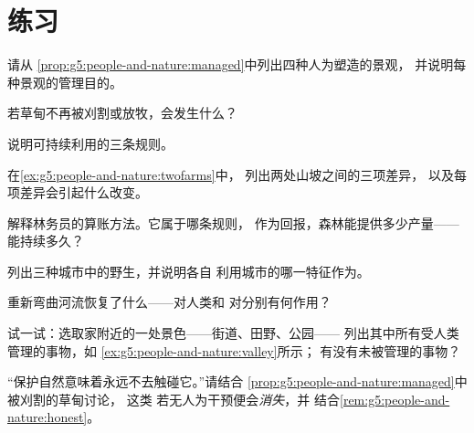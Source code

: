 \section{练习}

\begin{exercise}[$\star$]\label{exo:g5:people-and-nature:1}
请从
\cref{prop:g5:people-and-nature:managed}中列出四种人为塑造的景观，
并说明每种景观的管理目的。
\end{exercise}

\begin{exercise}[$\star$]\label{exo:g5:people-and-nature:2}
若草甸不再被刈割或放牧，会发生什么？
\end{exercise}

\begin{exercise}[$\star$]\label{exo:g5:people-and-nature:3}
说明可持续利用的三条规则。
\end{exercise}

\begin{exercise}[$\star$]\label{exo:g5:people-and-nature:4}
在\cref{ex:g5:people-and-nature:twofarms}中，
列出两处山坡之间的三项差异，
以及每项差异会引起什么改变。
\end{exercise}

\begin{exercise}[$\star$]\label{exo:g5:people-and-nature:5}
解释林务员的算账方法。它属于哪条规则，
作为回报，森林能提供多少产量——能持续多久？
\end{exercise}

\begin{exercise}[$\star$]\label{exo:g5:people-and-nature:6}
列出三种城市中的野生，并说明各自
利用城市的哪一特征作为。
\end{exercise}

\begin{exercise}[$\star$]\label{exo:g5:people-and-nature:7}
重新弯曲河流恢复了什么——对人类和
对分别有何作用？
\end{exercise}

\begin{exercise}[$\star$]\label{exo:g5:people-and-nature:8}
试一试：选取家附近的一处景色——街道、田野、公园——
列出其中所有受人类管理的事物，如
\cref{ex:g5:people-and-nature:valley}所示；
有没有未被管理的事物？
\end{exercise}

\begin{exercise}[$\star\star$]\label{exo:g5:people-and-nature:9}
“保护自然意味着永远不去触碰它。”请结合
\cref{prop:g5:people-and-nature:managed}中被刈割的草甸讨论，
这类
若无人为干预便会\emph{消失}，并
结合\cref{rem:g5:people-and-nature:honest}。
\end{exercise}

